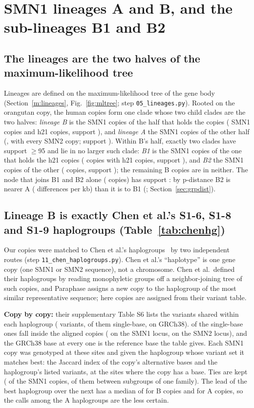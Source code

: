 \section{SMN1 lineages A and B, and the sub-lineages B1 and B2}\label{sec:lineages}
\subsection{The lineages are the two halves of the maximum-likelihood tree}\label{sec:apart}
Lineages are defined on the maximum-likelihood tree of the gene body (Section~\ref{m:lineages}, Fig.~\ref{fig:mltree};
step \texttt{05\_\allowbreak lineages.py}). Rooted on the orangutan copy, the human copies form one clade whose two child clades
are the two halves: \emph{lineage B} is the SMN1 copies of the half that holds the \cpe{} copies (\linB{} SMN1 copies
and \mlBsideHtwentyone{} h21 copies, support \mlIsup), and \emph{lineage A} the SMN1 copies of the other half (\linA,
with every SMN2 copy; support \mlIIsup). Within B's half, exactly two clades have support $\ge$95
and lie in no larger such clade: \emph{B1} is the SMN1 copies of the one that holds the h21 copies (\linBone{} copies with
\mlBhH{} h21 copies, support \mlBhSup), and \emph{B2} the SMN1 copies of the other (\linBtwo{} copies, support
\mlEightSup); the \linBnone{} remaining B copies are in neither. The node that joins B1 and B2 alone (\mlBBjoinCopies{}
copies) has support \mlBBjoinSup: by p-distance B2 is nearer A (\gsABtwo{} differences per kb) than it is to B1
(\gsBoneBtwo; Section~\ref{sec:grpdist}).

\subsection{Lineage B is exactly Chen et al.'s S1-6, S1-8 and S1-9 haplogroups (Table~\ref{tab:chenhg})}\label{sec:chenhg}
Our copies were matched to Chen et al.'s haplogroups~\cite{chen2023} by two independent routes (step
\texttt{11\_chen\_\allowbreak haplogroups.py}). Chen et al.'s ``haplotype'' is one gene copy (one SMN1 or SMN2 sequence), not a
chromosome. Chen et al.\ defined their haplogroups by reading monophyletic groups off a neighbor-joining tree of
such copies, and Paraphase assigns a new copy to the haplogroup of the most similar representative sequence; here copies are
assigned from their variant table.

\textbf{Copy by copy:} their supplementary Table S6 lists the variants shared within each haplogroup
(\hgSixVar{} variants, \hgSixSnv{} of them single-base, on GRCh38). \hgPlaced{} of the single-base ones fall inside the
aligned copies (\hgPlacedOne{} on the SMN1 locus, \hgPlacedTwo{} on the SMN2 locus), and the GRCh38 base at every one
is the reference base the table gives. Each SMN1 copy was genotyped at these sites and given the haplogroup whose
variant set it matches best: the Jaccard index of the copy's alternative bases and the haplogroup's listed variants,
at the sites where the copy has a base. Ties are kept (\hgTied{} of the \hgCopies{} SMN1 copies, \hgWithinTie{} of them between
subgroups of one family). The lead of the best haplogroup over the next has a median of \hgMarginB{} for B copies and
\hgMarginA{} for A copies, so the calls among the A haplogroups are the less certain.

